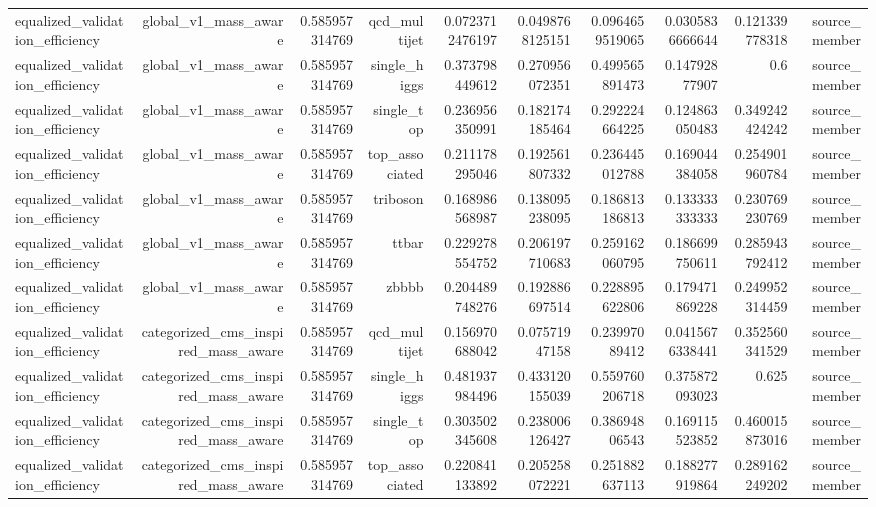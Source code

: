 \begin{table}[htbp]
{\begin{tabular}{lrrrrrrrrr}
equalized\_validation\_efficiency & global\_v1\_mass\_aware & 0.585957314769 & qcd\_multijet & 0.0723712476197 & 0.0498768125151 & 0.0964659519065 & 0.0305836666644 & 0.121339778318 & source\_member \\
equalized\_validation\_efficiency & global\_v1\_mass\_aware & 0.585957314769 & single\_higgs & 0.373798449612 & 0.270956072351 & 0.499565891473 & 0.14792877907 & 0.6 & source\_member \\
equalized\_validation\_efficiency & global\_v1\_mass\_aware & 0.585957314769 & single\_top & 0.236956350991 & 0.182174185464 & 0.292224664225 & 0.124863050483 & 0.349242424242 & source\_member \\
equalized\_validation\_efficiency & global\_v1\_mass\_aware & 0.585957314769 & top\_associated & 0.211178295046 & 0.192561807332 & 0.236445012788 & 0.169044384058 & 0.254901960784 & source\_member \\
equalized\_validation\_efficiency & global\_v1\_mass\_aware & 0.585957314769 & triboson & 0.168986568987 & 0.138095238095 & 0.186813186813 & 0.133333333333 & 0.230769230769 & source\_member \\
equalized\_validation\_efficiency & global\_v1\_mass\_aware & 0.585957314769 & ttbar & 0.229278554752 & 0.206197710683 & 0.259162060795 & 0.186699750611 & 0.285943792412 & source\_member \\
equalized\_validation\_efficiency & global\_v1\_mass\_aware & 0.585957314769 & zbbbb & 0.204489748276 & 0.192886697514 & 0.228895622806 & 0.179471869228 & 0.249952314459 & source\_member \\
equalized\_validation\_efficiency & categorized\_cms\_inspired\_mass\_aware & 0.585957314769 & qcd\_multijet & 0.156970688042 & 0.07571947158 & 0.23997089412 & 0.0415676338441 & 0.352560341529 & source\_member \\
equalized\_validation\_efficiency & categorized\_cms\_inspired\_mass\_aware & 0.585957314769 & single\_higgs & 0.481937984496 & 0.433120155039 & 0.559760206718 & 0.375872093023 & 0.625 & source\_member \\
equalized\_validation\_efficiency & categorized\_cms\_inspired\_mass\_aware & 0.585957314769 & single\_top & 0.303502345608 & 0.238006126427 & 0.38694806543 & 0.169115523852 & 0.460015873016 & source\_member \\
equalized\_validation\_efficiency & categorized\_cms\_inspired\_mass\_aware & 0.585957314769 & top\_associated & 0.220841133892 & 0.205258072221 & 0.251882637113 & 0.188277919864 & 0.289162249202 & source\_member \\

\end{tabular}}
\end{table}

